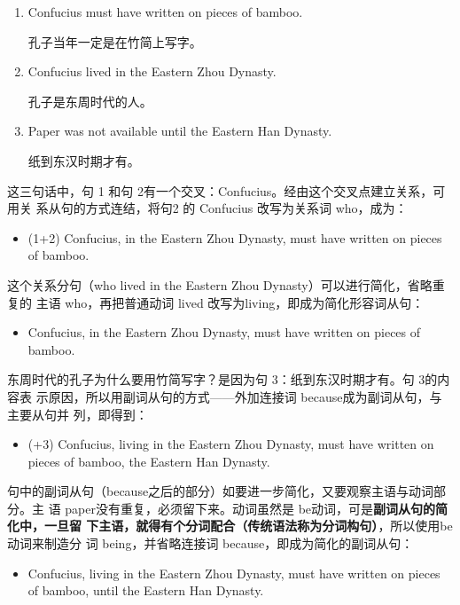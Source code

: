 \begin{enumerate}
\item Confucius must have written on pieces of bamboo.

  孔子当年一定是在竹简上写字。
\item Confucius lived in the Eastern Zhou Dynasty.

  孔子是东周时代的人。
\item Paper was not available until the Eastern Han Dynasty.

  纸到东汉时期才有。
\end{enumerate}

这三句话中，句 1 和句 2有一个交叉：Confucius。经由这个交叉点建立关系，可用关
系从句的方式连结，将句2 的 Confucius 改写为关系词 who，成为：
\begin{itemize}
\item (1+2) Confucius,  in the Eastern Zhou Dynasty, must have
  written on pieces of bamboo.
\end{itemize}
这个关系分句（who lived in the Eastern Zhou Dynasty）可以进行简化，省略重复的
主语 who，再把普通动词 lived 改写为living，即成为简化形容词从句：
\begin{itemize}
\item Confucius,  in the Eastern Zhou Dynasty, must have written on
  pieces of bamboo.
\end{itemize}
东周时代的孔子为什么要用竹简写字？是因为句 3：纸到东汉时期才有。句 3的内容表
示原因，所以用副词从句的方式——外加连接词 because成为副词从句，与主要从句并
列，即得到：
\begin{itemize}
\item (+3) Confucius, living in the Eastern Zhou Dynasty, must have written on
  pieces of bamboo,  the Eastern Han Dynasty.
\end{itemize}

句中的副词从句（because之后的部分）如要进一步简化，又要观察主语与动词部分。主
语 paper没有重复，必须留下来。动词虽然是 be动词，可是\textbf{副词从句的简化中，一旦留
下主语，就得有个分词配合（传统语法称为分词构句）}，所以使用be 动词来制造分
词 being，并省略连接词 because，即成为简化的副词从句：

\begin{itemize}
\item Confucius, living in the Eastern Zhou Dynasty, must have written on
  pieces of bamboo,  until the Eastern Han Dynasty.
\end{itemize}

